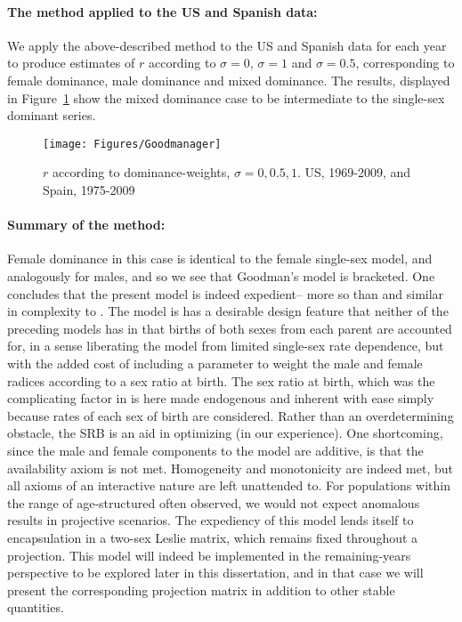 \paragraph{The method applied to the US and Spanish data: } We apply the
above-described method to the US and Spanish data for each year to produce
estimates of $r$ according to $\sigma = 0$, $\sigma = 1$ and $\sigma = 0.5$,
corresponding to female dominance, male dominance and mixed dominance. The
results, displayed in Figure~\ref{fig:Goodmanr} show the mixed dominance case to
be intermediate to the single-sex dominant series. 

\begin{figure}[ht!]
        \centering  
          \caption{$r$ according to dominance-weights, $\sigma = 0, 0.5, 1$.
          US, 1969-2009, and Spain, 1975-2009}
           \texttt{[image: Figures/Goodmanager]}
          \label{fig:Goodmanr}
\end{figure}

\paragraph{Summary of the method: }
Female dominance in this case is identical to the female single-sex model, and
analogously for males, and so we see that Goodman's model is bracketed. One concludes that the present
model is indeed expedient-- more so than \citet{mitra1978derivation} and similar
in complexity to \citet{pollard1948measurement}. The model is has a desirable
design feature that neither of the preceding models has in that 
births of both sexes from each parent are accounted for, in a sense liberating
the model from limited single-sex rate dependence, but with the added cost of 
including a parameter to weight the male and female radices according 
to a sex ratio at birth. The sex ratio at birth, which was the complicating factor in
\citet{mitra1978derivation} is here made endogenous and inherent with ease
simply because rates of each sex of birth are considered. Rather than an
overdetermining obstacle, the SRB is an aid in optimizing (in our experience).
One shortcoming, since the male and female components to the model are
additive, is that the availability axiom is not met. Homogeneity and
monotonicity are indeed met, but all axioms of an interactive nature are left
unattended to. For populations within the range of age-structured often
observed, we would not expect anomalous results in projective scenarios. The
expediency of this model lends itself to encapsulation in a two-sex Leslie
matrix, which remains fixed throughout a projection. This model will indeed be
implemented in the remaining-years perspective to be explored later in this
dissertation, and in that case we will present the corresponding projection
matrix in addition to other stable quantities.

\FloatBarrier
